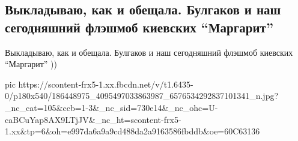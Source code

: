  
 
 
 
 

\subsection{Выкладываю, как и обещала. Булгаков и наш сегодняшний флэшмоб киевских \enquote{Маргарит}}
\label{sec:15_05_2021.fb.luzina_lada.1.bulgakov_fleshmob_margarity}

Выкладываю, как и обещала. Булгаков и наш сегодняшний флэшмоб киевских
\enquote{Маргарит} ))

\ifcmt
  pic https://scontent-frx5-1.xx.fbcdn.net/v/t1.6435-0/p180x540/186448975_4095497033863987_6576534292837101341_n.jpg?_nc_cat=105&ccb=1-3&_nc_sid=730e14&_nc_ohc=U-caBCuYap8AX9LTjJV&_nc_ht=scontent-frx5-1.xx&tp=6&oh=e997da6a9a9cd488da2a9163586fbddb&oe=60C63136
\fi

